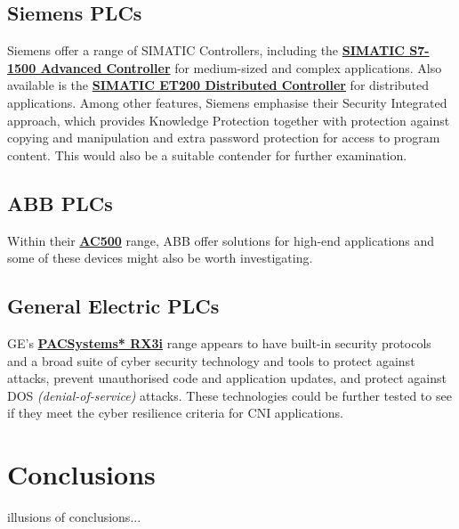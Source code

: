 \documentclass[12pt]{article}
\begin{document}
\subsection{Siemens PLCs}
Siemens offer a range of SIMATIC Controllers, including the \href{https://www.siemens.com/global/en/home/products/automation/systems/industrial/plc/simatic-s7-1500.html}{\textbf{SIMATIC S7-1500 Advanced Controller}} for medium-sized and complex applications. Also available is the \href{https://w3.siemens.com/mcms/distributed-io/en/pages/default.aspx}{\textbf{SIMATIC ET200 Distributed Controller}} for distributed applications. Among other features, Siemens emphasise their Security Integrated approach, which provides Knowledge Protection together with protection against copying and manipulation and extra password protection for access to program content. This would also be a suitable contender for further examination.
\subsection{ABB PLCs}
Within their \href{http://new.abb.com/plc/programmable-logic-controllers-plcs/ac500}{\textbf{AC500}} range, ABB offer solutions for high-end applications and some of these devices might also be worth investigating.
\subsection{General Electric PLCs}
GE's \href{http://www.geautomation.com/products/pacsystems-rx3i-controller}{\textbf{PACSystems* RX3i}} range appears to have built-in security protocols and a broad suite of cyber security technology and tools to protect against attacks, prevent unauthorised code and application updates, and protect against DOS \textit{(denial-of-service)} attacks. These technologies could be further tested to see if they meet the cyber resilience criteria for CNI applications.

\pagebreak
\section{Conclusions}
illusions of conclusions...



\end{document}
